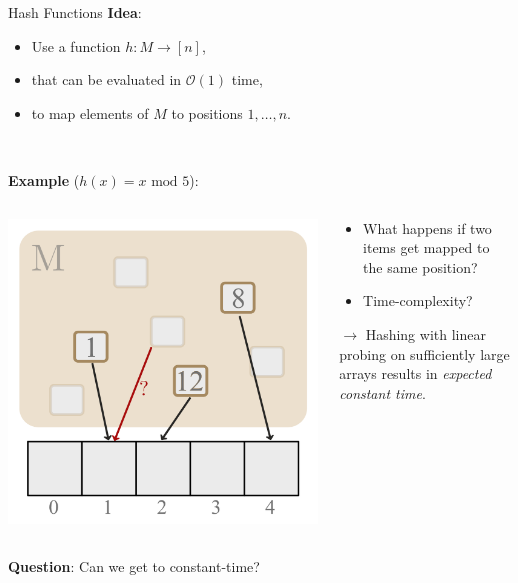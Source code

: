 \documentclass[10pt]{beamer}
\begin{document}
\begin{frame}[fragile]{Hash Functions}
    \textbf{Idea}:
    \vspace{-.75em}
    \begin{itemize}
        \item Use a function $ h : M \to [n] $,
        \item that can be evaluated in $ \mathcal{O}(1) $ time,
        \item to map elements of $ M $ to positions $ 1, \dots, n $.
    \end{itemize}
    \\
    \vfill

    \textbf{Example} ($ h(x) = x \text{ mod } 5 $):
    \begin{columns}[T]
    \begin{column}{.3\textwidth}
        \includegraphics[height=.5\textheight]{Images/Hashing/Hashing_02}
    \end{column}

    \begin{column}{.5\textwidth}
        \begin{itemize}
            \item What happens if two items get mapped to the same position? \pause
            \item Time-complexity? \pause
        \end{itemize}
        \vspace{3em}
        $ \to $ Hashing with linear probing on sufficiently large arrays results in
        \textit{expected constant time}. \pause
    \end{column}
    \end{columns}

    \textbf{Question}: Can we get to constant-time?
\end{frame}
\end{document}
